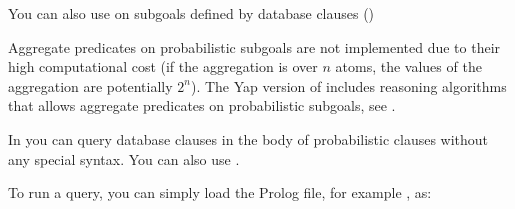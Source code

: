 \documentclass[letterpaper,10pt,english]{sphinxmanual}
\begin{document}
You can also use  on subgoals defined by database clauses ()

\begin{sphinxVerbatim}[commandchars=\\\{\}]
 
 
 

 
  

 

\end{sphinxVerbatim}

Aggregate predicates on probabilistic subgoals are not implemented due to their high computational cost (if the aggregation is over \(n\) atoms, the values of the aggregation are potentially \(2^n\)).
The Yap version of  includes reasoning algorithms that allows aggregate predicates on probabilistic subgoals, see .

In  you can query database clauses in the body of probabilistic clauses without any special syntax.
You can also use .

To run a query, you can simply load the Prolog file, for example , as:
\end{document}
